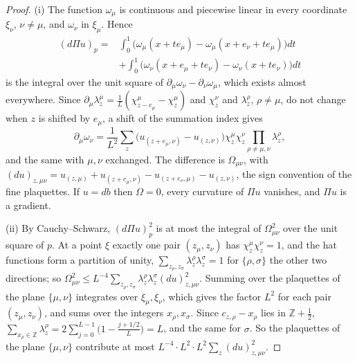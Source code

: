 \documentclass[11pt]{amsart}
\theoremstyle{definition}
\theoremstyle{remark}
\numberwithin{equation}{section}
\newcommand{\Z}{\mathbb{Z}}
\begin{document}
\begin{proof}
(i) The function $\omega_\mu$ is continuous and piecewise linear in every
coordinate $\xi_\nu$, $\nu\ne\mu$, and $\omega_\nu$ in $\xi_\mu$. Hence
\[
\begin{split}
(d\Pi u)_p={}&\int_0^1\bigl(\omega_\mu(x+te_\mu)-\omega_\mu(x+e_\nu+te_\mu)
\bigr)dt\\
&+\int_0^1\bigl(\omega_\nu(x+e_\mu+te_\nu)-\omega_\nu(x+te_\nu)\bigr)dt
\end{split}
\]
is the integral over the unit square of $\partial_\mu\omega_\nu-\partial_\nu
\omega_\mu$, which exists almost everywhere. Since $\partial_\mu\lambda^\mu_z
=\frac1L(\chi^\mu_{z-e_\mu}-\chi^\mu_z)$ and $\chi^\nu_z$ and
$\lambda^\rho_z$, $\rho\ne\mu$, do not change when $z$ is shifted by
$e_\mu$, a shift of the summation index gives
\[
\partial_\mu\omega_\nu=\frac1{L^2}\sum_z\bigl(u_{(z+e_\mu,\nu)}-u_{(z,\nu)}
\bigr)\chi^\mu_z\chi^\nu_z\prod_{\rho\ne\mu,\nu}\lambda^\rho_z ,
\]
and the same with $\mu,\nu$ exchanged. The difference is $\Omega_{\mu\nu}$,
with $(du)_{z,\mu\nu}=u_{(z,\mu)}+u_{(z+e_\mu,\nu)}-u_{(z+e_\nu,\mu)}-
u_{(z,\nu)}$, the sign convention of the fine plaquettes. If $u=db$ then
$\Omega=0$, every curvature of $\Pi u$ vanishes, and $\Pi u$ is a gradient.

(ii) By Cauchy--Schwarz, $(d\Pi u)_p^2$ is at most the integral of
$\Omega_{\mu\nu}^2$ over the unit square of $p$. At a point $\xi$ exactly
one pair $(z_\mu,z_\nu)$ has $\chi^\mu_z\chi^\nu_z=1$, and the hat
functions form a partition of unity, $\sum_{z_\rho,z_\sigma}\lambda^\rho_z
\lambda^\sigma_z=1$ for $\{\rho,\sigma\}$ the other two directions; so
$\Omega_{\mu\nu}^2\le L^{-4}\sum_{z_\rho,z_\sigma}\lambda^\rho_z\lambda^
\sigma_z(du)^2_{z,\mu\nu}$. Summing over the plaquettes of the plane
$\{\mu,\nu\}$ integrates over $\xi_\mu,\xi_\nu$, which gives the factor
$L^2$ for each pair $(z_\mu,z_\nu)$, and sums over the integers $x_\rho,
x_\sigma$. Since $c_{z,\rho}-x_\rho$ lies in $\Z+\frac12$, $\sum_{x_\rho\in
\Z}\lambda^\rho_z=2\sum_{j=0}^{L-1}\bigl(1-\frac{j+1/2}L\bigr)=L$, and the
same for $\sigma$. So the plaquettes of the plane $\{\mu,\nu\}$ contribute
at most $L^{-4}\cdot L^2\cdot L^2\sum_z(du)^2_{z,\mu\nu}$.


\end{proof}
\end{document}
